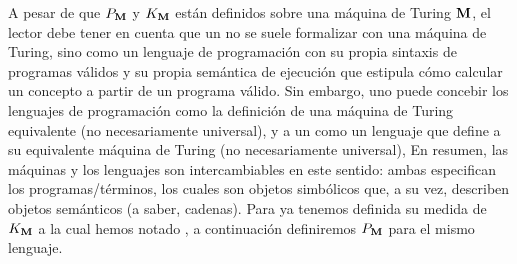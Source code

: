 A pesar de que $P_{{\bf M}}$ y $K_{{\bf M}}$ están definidos sobre una máquina de Turing ${\bf M}$, el lector debe tener en cuenta que un \lot no se suele formalizar con una máquina de Turing, sino como un lenguaje de programación con su propia sintaxis de programas válidos y su propia semántica de ejecución que estipula cómo calcular un concepto a partir de un programa válido. Sin embargo, uno puede concebir los lenguajes de programación como la definición de una máquina de Turing equivalente (no necesariamente universal), y a un \lot como un lenguaje que define a su equivalente máquina de Turing (no necesariamente universal), En resumen, las máquinas y los lenguajes son intercambiables en este  sentido: ambas especifican los programas/términos, los cuales son objetos simbólicos que, a su vez, describen objetos semánticos (a saber, cadenas). Para \gramgeo ya tenemos definida su medida de $K_{{\bf M}}$ a la cual hemos notado \mdlgeo, a continuación definiremos $P_{{\bf M}}$ para el mismo lenguaje.





